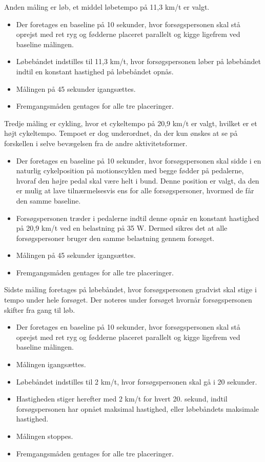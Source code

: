 Anden måling er løb, et middel løbetempo på 11,3 km/t er valgt\citep{Miles2007}. \vspace{-3mm}
\begin{itemize}
	\item Der foretages en baseline på 10 sekunder, hvor forsøgspersonen skal stå oprejst med ret ryg og fødderne placeret parallelt og kigge ligefrem ved baseline målingen.
	\item Løbebåndet indstilles til 11,3 km/t, hvor forsøgspersonen løber på løbebåndet indtil en konstant hastighed på løbebåndet opnås. 
	\item Målingen på 45 sekunder igangsættes.
	\item Fremgangsmåden gentages for alle tre placeringer.
\end{itemize}
 
Tredje måling er cykling, hvor et cykeltempo på 20,9 km/t er valgt, hvilket er et højt cykeltempo\citep{Miles2007}. Tempoet er dog underordnet, da der kun ønskes at se på forskellen i selve bevægelsen fra de andre aktivitetsformer. \vspace{-3mm}
\begin{itemize}
	\item Der foretages en baseline på 10 sekunder, hvor forsøgspersonen skal sidde i en naturlig cykelposition på motionscyklen med begge fødder på pedalerne, hvoraf den højre pedal skal være helt i bund. Denne position er valgt, da den er mulig at lave tilnærmelsesvis ens for alle forsøgspersoner, hvormed de får den samme baseline.
	\item Forsøgspersonen træder i pedalerne indtil denne opnår en konstant hastighed på 20,9 km/t ved en belastning på 35 W. Dermed sikres det at alle forsøgspersoner bruger den samme belastning gennem forsøget.  
	\item Målingen på 45 sekunder igangsættes. 
	\item Fremgangsmåden gentages for alle tre placeringer.
\end{itemize}

Sidste måling foretages på løbebåndet, hvor forsøgspersonen gradvist skal stige i tempo under hele forsøget. Der noteres under forsøget hvornår forsøgspersonen skifter fra gang til løb.  \vspace{-3mm}
\begin{itemize}
	\item Der foretages en baseline på 10 sekunder, hvor forsøgspersonen skal stå oprejst med ret ryg og fødderne placeret parallelt og kigge ligefrem ved baseline målingen.
	\item Målingen igangsættes.
	\item Løbebåndet indstilles til 2 km/t, hvor forsøgspersonen skal gå i 20 sekunder.  
	\item Hastigheden stiger herefter med 2 km/t for hvert 20. sekund, indtil forsøgspersonen har opnået maksimal hastighed, eller løbebåndets maksimale hastighed. 
	\item Målingen stoppes. 
	\item Fremgangsmåden gentages for alle tre placeringer.
\end{itemize}


